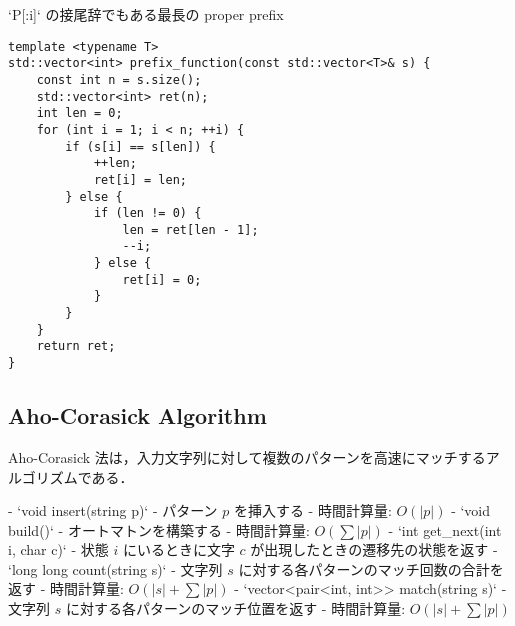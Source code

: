 \begin{small}
\begin{markdown}
`P[:i]` の接尾辞でもある最長の proper prefix
\end{markdown}
\end{small}

\begin{lstlisting}
template <typename T>
std::vector<int> prefix_function(const std::vector<T>& s) {
    const int n = s.size();
    std::vector<int> ret(n);
    int len = 0;
    for (int i = 1; i < n; ++i) {
        if (s[i] == s[len]) {
            ++len;
            ret[i] = len;
        } else {
            if (len != 0) {
                len = ret[len - 1];
                --i;
            } else {
                ret[i] = 0;
            }
        }
    }
    return ret;
}
\end{lstlisting}

\subsection{Aho-Corasick Algorithm}

\begin{small}
\begin{markdown}
Aho-Corasick 法は，入力文字列に対して複数のパターンを高速にマッチするアルゴリズムである．

- `void insert(string p)`
    - パターン $p$ を挿入する
    - 時間計算量: $O(\vert p\vert)$
- `void build()`
    - オートマトンを構築する
    - 時間計算量: $O(\sum \vert p\vert)$
- `int get\_next(int i, char c)`
    - 状態 $i$ にいるときに文字 $c$ が出現したときの遷移先の状態を返す
- `long long count(string s)`
    - 文字列 $s$ に対する各パターンのマッチ回数の合計を返す
    - 時間計算量: $O(\vert s\vert + \sum \vert p\vert)$
- `vector<pair<int, int>> match(string s)`
    - 文字列 $s$ に対する各パターンのマッチ位置を返す
    - 時間計算量: $O(\vert s\vert + \sum \vert p\vert)$
\end{markdown}
\end{small}

